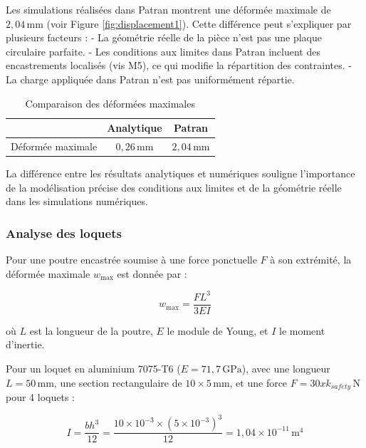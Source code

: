 
Les simulations réalisées dans Patran montrent une déformée maximale de \(2,04 \, \text{mm}\) (voir Figure \ref{fig:displacement1}). Cette différence peut s'expliquer par plusieurs facteurs :
- La géométrie réelle de la pièce n'est pas une plaque circulaire parfaite.
- Les conditions aux limites dans Patran incluent des encastrements localisés (vis M5), ce qui modifie la répartition des contraintes.
- La charge appliquée dans Patran n'est pas uniformément répartie.


\begin{table}[h!]
    \centering
    \caption{Comparaison des déformées maximales}
    \begin{tabular}{|c|c|c|}
    \hline
    & \textbf{Analytique} & \textbf{Patran} \\
    \hline
    Déformée maximale & \(0,26 \, \text{mm}\) & \(2,04 \, \text{mm}\) \\
    \hline
    \end{tabular}
    \label{tab:deformee_comparaison}
\end{table}

La différence entre les résultats analytiques et numériques souligne l'importance de la modélisation précise des conditions aux limites et de la géométrie réelle dans les simulations numériques.


\subsubsection{Analyse des loquets}


Pour une poutre encastrée soumise à une force ponctuelle \(F\) à son extrémité, la déformée maximale \(w_{\text{max}}\) est donnée par :

\[
w_{\text{max}} = \frac{F L^3}{3 E I}
\]

où \(L\) est la longueur de la poutre, \(E\) le module de Young, et \(I\) le moment d'inertie.

Pour un loquet en aluminium 7075-T6 (\(E = 71,7 \, \text{GPa}\)), avec une longueur \(L = 50 \, \text{mm}\), une section rectangulaire de \(10 \times 5 \, \text{mm}\), et une force \(F = 30xk_{safety} \, \text{N}\) pour 4 loquets :

\[
I = \frac{b h^3}{12} = \frac{10 \times 10^{-3} \times (5 \times 10^{-3})^3}{12} = 1,04 \times 10^{-11} \, \text{m}^4
\]

